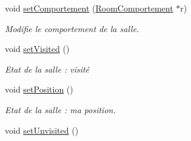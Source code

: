 \begin{DoxyCompactItemize}
void \hyperlink{class_room_a78150061fe95e0d03b8730fb151cc39f}{set\-Comportement} (\hyperlink{class_room_comportement}{Room\-Comportement} $\ast$r)
\begin{DoxyCompactList}\small\item\em Modifie le comportement de la salle. \end{DoxyCompactList}\item 
\hypertarget{class_room_a50d357cd356b3b1d1bd8e7d9217e5b71}{void \hyperlink{class_room_a50d357cd356b3b1d1bd8e7d9217e5b71}{set\-Visited} ()}\label{class_room_a50d357cd356b3b1d1bd8e7d9217e5b71}

\begin{DoxyCompactList}\small\item\em Etat de la salle \-: visité \end{DoxyCompactList}\item 
\hypertarget{class_room_ac5949bc2fb5288c733369ad51af7b084}{void \hyperlink{class_room_ac5949bc2fb5288c733369ad51af7b084}{set\-Position} ()}\label{class_room_ac5949bc2fb5288c733369ad51af7b084}

\begin{DoxyCompactList}\small\item\em Etat de la salle \-: ma position. \end{DoxyCompactList}\item 
\hypertarget{class_room_abcedb8c7a1685089a797805c0567219a}{void \hyperlink{class_room_abcedb8c7a1685089a797805c0567219a}{set\-Unvisited} ()}\label{class_room_abcedb8c7a1685089a797805c0567219a}


\end{DoxyCompactItemize}
